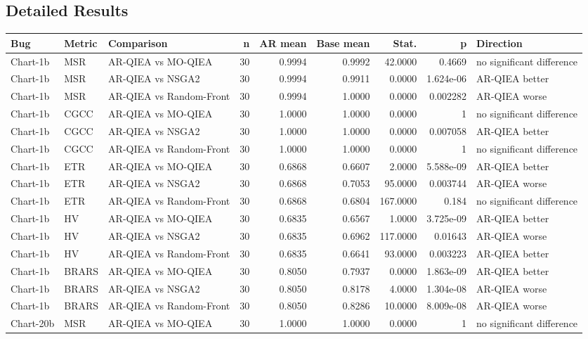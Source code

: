 \subsection{Detailed Results}
\begin{tabular}{lllrrrrrl}
Bug & Metric & Comparison & n & AR mean & Base mean & Stat. & p & Direction \\
\hline
Chart-1b & MSR & AR-QIEA vs MO-QIEA & 30 & 0.9994 & 0.9992 & 42.0000 & 0.4669 & no significant difference \\
Chart-1b & MSR & AR-QIEA vs NSGA2 & 30 & 0.9994 & 0.9911 & 0.0000 & 1.624e-06 & AR-QIEA better \\
Chart-1b & MSR & AR-QIEA vs Random-Front & 30 & 0.9994 & 1.0000 & 0.0000 & 0.002282 & AR-QIEA worse \\
Chart-1b & CGCC & AR-QIEA vs MO-QIEA & 30 & 1.0000 & 1.0000 & 0.0000 & 1 & no significant difference \\
Chart-1b & CGCC & AR-QIEA vs NSGA2 & 30 & 1.0000 & 1.0000 & 0.0000 & 0.007058 & AR-QIEA better \\
Chart-1b & CGCC & AR-QIEA vs Random-Front & 30 & 1.0000 & 1.0000 & 0.0000 & 1 & no significant difference \\
Chart-1b & ETR & AR-QIEA vs MO-QIEA & 30 & 0.6868 & 0.6607 & 2.0000 & 5.588e-09 & AR-QIEA better \\
Chart-1b & ETR & AR-QIEA vs NSGA2 & 30 & 0.6868 & 0.7053 & 95.0000 & 0.003744 & AR-QIEA worse \\
Chart-1b & ETR & AR-QIEA vs Random-Front & 30 & 0.6868 & 0.6804 & 167.0000 & 0.184 & no significant difference \\
Chart-1b & HV & AR-QIEA vs MO-QIEA & 30 & 0.6835 & 0.6567 & 1.0000 & 3.725e-09 & AR-QIEA better \\
Chart-1b & HV & AR-QIEA vs NSGA2 & 30 & 0.6835 & 0.6962 & 117.0000 & 0.01643 & AR-QIEA worse \\
Chart-1b & HV & AR-QIEA vs Random-Front & 30 & 0.6835 & 0.6641 & 93.0000 & 0.003223 & AR-QIEA better \\
Chart-1b & BRARS & AR-QIEA vs MO-QIEA & 30 & 0.8050 & 0.7937 & 0.0000 & 1.863e-09 & AR-QIEA better \\
Chart-1b & BRARS & AR-QIEA vs NSGA2 & 30 & 0.8050 & 0.8178 & 4.0000 & 1.304e-08 & AR-QIEA worse \\
Chart-1b & BRARS & AR-QIEA vs Random-Front & 30 & 0.8050 & 0.8286 & 10.0000 & 8.009e-08 & AR-QIEA worse \\
Chart-20b & MSR & AR-QIEA vs MO-QIEA & 30 & 1.0000 & 1.0000 & 0.0000 & 1 & no significant difference \\

\end{tabular}
